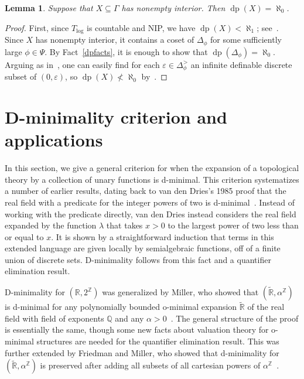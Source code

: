\documentclass[11pt]{amsart}
\theoremstyle{plain}
\newtheorem{lemma}[thm]{Lemma}
\theoremstyle{definition}
\numberwithin{equation}{section}
\newcommand\Q{\mathbb{Q}}
\newcommand\R{\mathbb{R}}
\newcommand\Z{\mathbb{Z}}
\newcommand\0{\varnothing}
\DeclareMathOperator\dpr{dp}
\begin{document}
\begin{lemma}\label{dpint}
Suppose that $X \subseteq \Gamma$ has nonempty interior. Then $\dpr(X) = \aleph_0$.
\end{lemma}
\begin{proof}
First, since $T_{\log}$ is countable and NIP, we have $\dpr(X)<\aleph_1$; see~\cite[Remark 2.3]{KOU13}. Since $X$ has nonempty interior, it contains a coset of $\Delta_\phi$ for some sufficiently large $\phi \in \Psi$. By Fact~\ref{dpfacts}, it is enough to show that $\dpr(\Delta_\phi) = \aleph_0$. Arguing as in~\cite[Theorem 3.6 (8)]{GehretKaplan-ACTlogdistal}, one can easily find for each $\varepsilon \in \Delta_\phi^>$ an infinite definable discrete subset of $(0,\varepsilon)$, so $\dpr(X) \not<\aleph_0$ by~\cite[Theorem 2.11]{DG17}.
\end{proof}


\section{D-minimality criterion and applications}\label{sec_dminimality_criterion}

\noindent
In this section, we give a general criterion for when the expansion of a topological theory by a collection of unary functions is d-minimal. This criterion systematizes a number of earlier results, dating back to van den Dries's 1985 proof that the real field with a predicate for the integer powers of two is d-minimal~\cite{vdd-realspowerstwo}. Instead of working with the predicate directly, van den Dries instead considers the real field expanded by the function $\lambda$ that takes $x>0$ to the largest power of two less than or equal to $x$. It is shown by a straightforward induction that terms in this extended language are given locally by semialgebraic functions, off of a finite union of discrete sets. D-minimality follows from this fact and a quantifier elimination result. 

\medskip\noindent
D-minimality for $(\R,2^\Z)$ was generalized by Miller, who showed that $(\tilde{\R},\alpha^\Z)$ is d-minimal for any polynomially bounded o-minimal expansion $\tilde{\R}$ of the real field with field of exponents $\Q$ and any $\alpha>0$~\cite{miller-tameness}. The general structure of the proof is essentially the same, though some new facts about valuation theory for o-minimal structures are needed for the quantifier elimination result. This was further extended by Friedman and Miller, who showed that d-minimality for $(\tilde{\R},\alpha^\Z)$ is preserved after adding all subsets of all cartesian powers of $\alpha^\Z$~\cite{FM01}.
\end{document}
